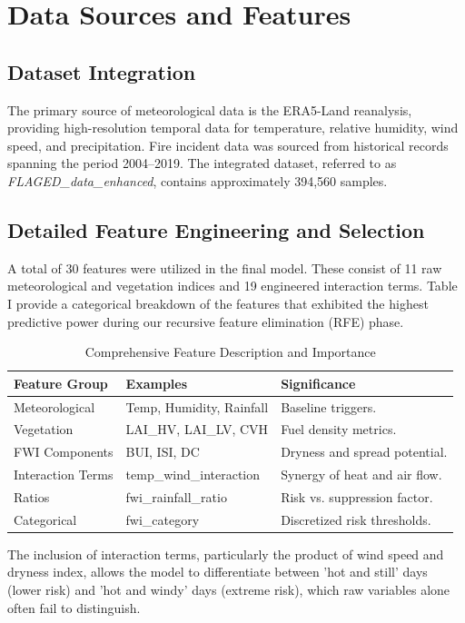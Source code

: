 \documentclass[conference]{IEEEtran}
\begin{document}
\section{Data Sources and Features}
\subsection{Dataset Integration}
The primary source of meteorological data is the ERA5-Land reanalysis, providing high-resolution temporal data for temperature, relative humidity, wind speed, and precipitation. Fire incident data was sourced from historical records spanning the period 2004--2019. The integrated dataset, referred to as \textit{FLAGED\_data_enhanced}, contains approximately 394,560 samples.

\subsection{Detailed Feature Engineering and Selection}
A total of 30 features were utilized in the final model. These consist of 11 raw meteorological and vegetation indices and 19 engineered interaction terms. Table I provide a categorical breakdown of the features that exhibited the highest predictive power during our recursive feature elimination (RFE) phase.

\begin{table}[h]
\caption{Comprehensive Feature Description and Importance}
\centering
\begin{tabular}{@{}lll@{}}
\toprule
\textbf{Feature Group} & \textbf{Examples} & \textbf{Significance} \\ \midrule
Meteorological & Temp, Humidity, Rainfall & Baseline triggers. \\
Vegetation & LAI\_HV, LAI\_LV, CVH & Fuel density metrics. \\
FWI Components & BUI, ISI, DC & Dryness and spread potential. \\
Interaction Terms & temp\_wind\_interaction & Synergy of heat and air flow. \\
Ratios & fwi\_rainfall\_ratio & Risk vs. suppression factor. \\
Categorical & fwi\_category & Discretized risk thresholds. \\ \bottomrule
\end{tabular}
\end{table}

The inclusion of interaction terms, particularly the product of wind speed and dryness index, allows the model to differentiate between 'hot and still' days (lower risk) and 'hot and windy' days (extreme risk), which raw variables alone often fail to distinguish.
\end{document}
